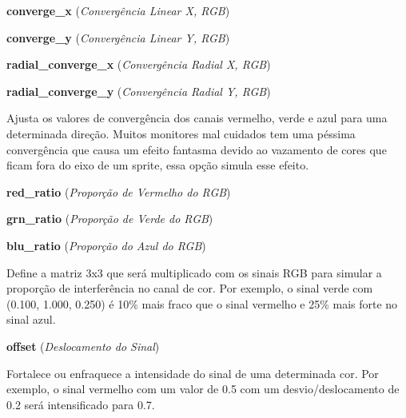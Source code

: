 \documentclass[letterpaper,10pt,brazil]{sphinxmanual}
\begin{document}
\begin{DUlineblock}{0em}
\begin{DUlineblock}{\DUlineblockindent}
\item[] 
\end{DUlineblock}
\item[] \textbf{converge\_x} (\emph{Convergência Linear X, RGB})
\item[] \textbf{converge\_y} (\emph{Convergência Linear Y, RGB})
\item[] \textbf{radial\_converge\_x} (\emph{Convergência Radial X, RGB})
\item[] \textbf{radial\_converge\_y} (\emph{Convergência Radial Y, RGB})
\item[] 
\item[]
\begin{DUlineblock}{\DUlineblockindent}
\item[] Ajusta os valores de convergência dos canais vermelho, verde e azul para uma determinada direção. Muitos monitores mal cuidados tem uma péssima convergência que causa um efeito fantasma devido ao vazamento de cores que ficam fora do eixo de um sprite, essa opção simula esse efeito.
\item[] 
\end{DUlineblock}
\item[] \textbf{red\_ratio} (\emph{Proporção de Vermelho do RGB})
\item[] \textbf{grn\_ratio} (\emph{Proporção de Verde do RGB})
\item[] \textbf{blu\_ratio} (\emph{Proporção do Azul do RGB})
\item[] 
\item[]
\begin{DUlineblock}{\DUlineblockindent}
\item[] Define a matriz 3x3 que será multiplicado com os sinais RGB para simular a proporção de interferência no canal de cor. Por exemplo, o sinal verde com (0.100, 1.000, 0.250) é 10\% mais fraco que o sinal vermelho e 25\% mais forte no sinal azul.
\item[] 
\end{DUlineblock}
\item[] \textbf{offset} (\emph{Deslocamento do Sinal})
\item[] 
\item[]
\begin{DUlineblock}{\DUlineblockindent}
\item[] Fortalece ou enfraquece a intensidade do sinal de uma determinada cor. Por exemplo, o sinal vermelho com um valor de 0.5 com um desvio/deslocamento de 0.2 será intensificado para 0.7.
\item[] 
\end{DUlineblock}

\end{DUlineblock}
\end{document}
